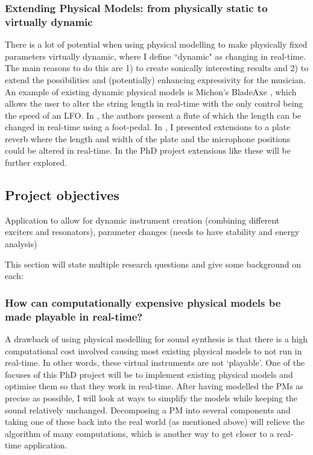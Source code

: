 \subsubsection*{Extending Physical Models: from physically static to virtually dynamic}
There is a lot of potential when using physical modelling to make physically fixed parameters virtually dynamic, where I define ``dynamic" as changing in real-time. The main reasons to do this are 1) to create sonically interesting results and 2) to extend the possibilities and (potentially) enhancing expressivity for the musician.
An example of existing dynamic physical models is Michon’s BladeAxe \cite{Michon2016}, which allows the user to alter the string length in real-time with the only control being the speed of an LFO. In \cite{Gelineck2005}, the authors present a flute of which the length can be changed in real-time using a foot-pedal. In \cite{Willemsen2017}, I presented extensions to a plate reverb where the length and width of the plate and the microphone positions could be altered in real-time. In the PhD project extensions like these will be further explored.

\subsection{Project objectives}
Application to allow for dynamic instrument creation (combining different exciters and resonators), parameter changes (needs to have stability and energy analysis) 

This section will state multiple research questions and give some background on each:

\subsubsection*{How can computationally expensive physical models be made playable in real-time?}
A drawback of using physical modelling for sound synthesis is that there is a high computational cost involved causing most existing physical models to not run in real-time. In other words, these virtual instruments are not ‘playable’. One of the focuses of this PhD project will be to implement existing physical models and optimise them so that they work in real-time. 
After having modelled the PMs as precise as possible, I will look at ways to simplify the models while keeping the sound relatively unchanged. Decomposing a PM into several components and taking one of these back into the real world (as mentioned above) will relieve the algorithm of many computations, which is another way to get closer to a real-time application.


